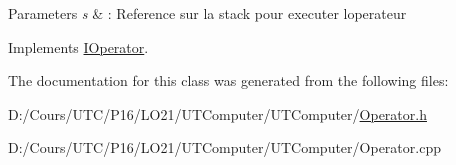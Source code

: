 \begin{DoxyParams}{Parameters}
{\em s} & \+: Reference sur la stack pour executer l\textquotesingle{}operateur \\
\hline
\end{DoxyParams}


Implements \hyperlink{class_i_operator_ab93ebb15195290da26e2f3e626f6f25e}{I\+Operator}.



The documentation for this class was generated from the following files\+:\begin{DoxyCompactItemize}
\item 
D\+:/\+Cours/\+U\+T\+C/\+P16/\+L\+O21/\+U\+T\+Computer/\+U\+T\+Computer/\hyperlink{_operator_8h}{Operator.\+h}\item 
D\+:/\+Cours/\+U\+T\+C/\+P16/\+L\+O21/\+U\+T\+Computer/\+U\+T\+Computer/Operator.\+cpp\end{DoxyCompactItemize}
